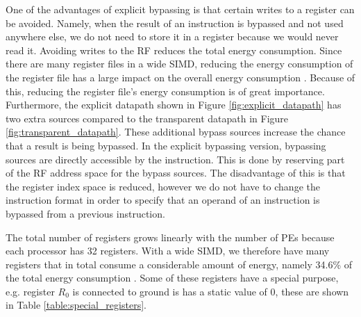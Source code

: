 One of the advantages of explicit bypassing is that certain writes to a register can be avoided. Namely, when the result of an instruction is bypassed and not used anywhere else, we do not need to store it in a register because we would never read it. Avoiding writes to the RF reduces the total energy consumption. Since there are many register files in a wide SIMD, reducing the energy consumption of the register file has a large impact on the overall energy consumption \cite{dongrio1}. Because of this, reducing the register file's energy consumption is of great importance. Furthermore, the explicit datapath shown in Figure \ref{fig:explicit_datapath} has two extra sources compared to the transparent datapath in Figure \ref{fig:transparent_datapath}. These additional bypass sources increase the chance that a result is being bypassed. In the explicit bypassing version, bypassing sources are directly accessible by the instruction. This is done by reserving part of the RF address space for the bypass sources. The disadvantage of this is that the register index space is reduced, however we do not have to change the instruction format in order to specify that an operand of an instruction is bypassed from a previous instruction.

The total number of registers grows linearly with the number of PEs because each processor has 32 registers. With a wide SIMD, we therefore have many registers that in total consume a considerable amount of energy, namely 34.6\% of the total energy consumption \cite{dongrio1}. Some of these registers have a special purpose, e.g. register $R_0$ is connected to ground is has a static value of $0$, these are shown in Table \ref{table:special_registers}.







